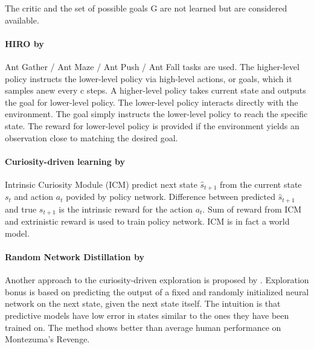 \documentclass[acmsmall, nonacm]{acmart}
\begin{document}
The critic and the set of possible goals G are not learned but are considered available.


\paragraph{HIRO by~\citet{Nachum2018DataEfficientHR}} %
\label{par:hiro}

Ant Gather / Ant Maze / Ant Push / Ant Fall tasks are used. The higher-level policy instructs the lower-level policy via high-level actions, or goals, which it samples anew every c steps. A higher-level policy takes current state and outputs the goal for lower-level policy. The lower-level policy interacts directly with the environment. The goal simply instructs the lower-level policy to reach the specific state. The reward for lower-level policy is provided if the environment yields an observation close to matching the desired goal.


\paragraph{Curiosity-driven learning by~\citet{pathak_curiosity-driven_2017}} %
\label{par:curiosity_driven_rl}

Intrinsic Curiosity Module (ICM) predict next state $\hat{s}_{t+1}$ from the current state $s_t$ and action $a_t$ povided by policy network. Difference between predicted $\hat{s}_{t+1}$ and true $s_{t+1}$ is the intrinsic reward for the action $a_t$. Sum of reward from ICM and extrinistic reward is used to train policy network. ICM is in fact a world model.


\paragraph{Random Network Distillation by~\citet{burda_exploration_2019}} %
\label{par:random_distillation}

Another approach to the curiosity-driven exploration is proposed by \citep{burda_exploration_2019}. Exploration bonus is based on predicting the output of a fixed and randomly initialized neural network on the next state, given the next state itself. The intuition is that predictive models have low error in states similar to the ones they have been trained on. The method shows better than average human performance on Montezuma’s Revenge.
\end{document}

